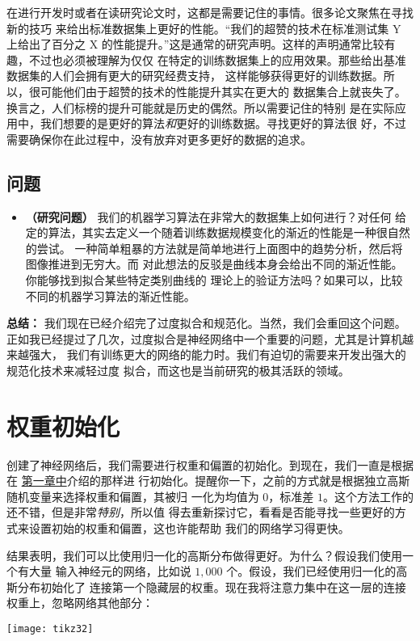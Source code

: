 在进行开发时或者在读研究论文时，这都是需要记住的事情。很多论文聚焦在寻找新的技巧
来给出标准数据集上更好的性能。“我们的超赞的技术在标准测试集 Y 上给出了百分之 X
的性能提升。”这是通常的研究声明。这样的声明通常比较有趣，不过也必须被理解为仅仅
在特定的训练数据集上的应用效果。那些给出基准数据集的人们会拥有更大的研究经费支持，
这样能够获得更好的训练数据。所以，很可能他们由于超赞的技术的性能提升其实在更大的
数据集合上就丧失了。换言之，人们标榜的提升可能就是历史的偶然。所以需要记住的特别
是在实际应用中，我们想要的是更好的算法\emph{和}更好的训练数据。寻找更好的算法很
好，不过需要确保你在此过程中，没有放弃对更多更好的数据的追求。

\subsection*{问题}

\begin{itemize}
\item \textbf{（研究问题）} 我们的机器学习算法在非常大的数据集上如何进行？对任何
  给定的算法，其实去定义一个随着训练数据规模变化的渐近的性能是一种很自然的尝试。
  一种简单粗暴的方法就是简单地进行上面图中的趋势分析，然后将图像推进到无穷大。而
  对此想法的反驳是曲线本身会给出不同的渐近性能。你能够找到拟合某些特定类别曲线的
  理论上的验证方法吗？如果可以，比较不同的机器学习算法的渐近性能。
\end{itemize}

\textbf{总结：} 我们现在已经介绍完了过度拟合和规范化。当然，我们会重回这个问题。
正如我已经提过了几次，过度拟合是神经网络中一个重要的问题，尤其是计算机越来越强大，
我们有训练更大的网络的能力时。我们有迫切的需要来开发出强大的规范化技术来减轻过度
拟合，而这也是当前研究的极其活跃的领域。

\section{权重初始化}
\label{sec:weight_initialization}

创建了神经网络后，我们需要进行权重和偏置的初始化。到现在，我们一直是根据在%
\hyperref[ch:UsingNeuralNetsToRecognizeHandwrittenDigits]{第一章中}介绍的那样进
行初始化。提醒你一下，之前的方式就是根据独立高斯随机变量来选择权重和偏置，其被归
一化为均值为 $0$，标准差 $1$。这个方法工作的还不错，但是非常\emph{特别}，所以值
得去重新探讨它，看看是否能寻找一些更好的方式来设置初始的权重和偏置，这也许能帮助
我们的网络学习得更快。

结果表明，我们可以比使用归一化的高斯分布做得更好。为什么？假设我们使用一个有大量
输入神经元的网络，比如说 $1,000$ 个。假设，我们已经使用归一化的高斯分布初始化了
连接第一个隐藏层的权重。现在我将注意力集中在这一层的连接权重上，忽略网络其他部分：
\begin{center}
  \texttt{[image: tikz32]}
\end{center}

